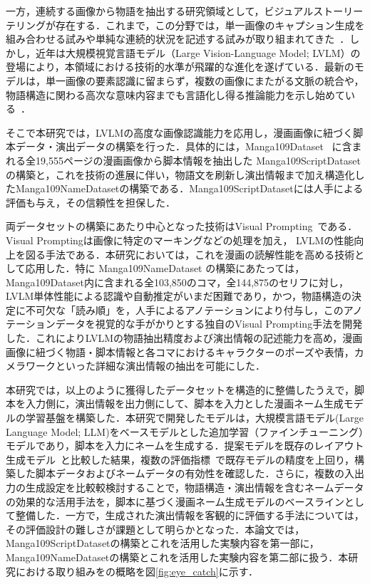 \documentclass[a4j,12pt,dvipdfmx]{jsreport}
\begin{document}
一方，連続する画像から物語を抽出する研究領域として，ビジュアルストーリーテリングが存在する．これまで，この分野では，単一画像のキャプション生成を組み合わせる試みや単純な連続的状況を記述する試みが取り組まれてきた~\cite{huang-etal-2016-visual, nahian_hierarchical_2019}．しかし，近年は大規模視覚言語モデル（Large Vision-Language Model; LVLM）の登場により，本領域における技術的水準が飛躍的な進化を遂げている．最新のモデルは，単一画像の要素認識に留まらず，複数の画像にまたがる文脈の統合や，物語構造に関わる高次な意味内容までも言語化し得る推論能力を示し始めている~\cite{yang_storyllava_2025}．

そこで本研究では，LVLMの高度な画像認識能力を応用し，漫画画像に紐づく脚本データ・演出データの構築を行った．具体的には，Manga109Dataset~\cite{matsui_2017_sketch} に含まれる全19,555ページの漫画画像から脚本情報を抽出した Manga109ScriptDatasetの構築と，これを技術の進展に伴い，物語文を刷新し演出情報まで加え構造化したManga109NameDatasetの構築である．Manga109ScriptDatasetには人手による評価も与え，その信頼性を担保した．

両データセットの構築にあたり中心となった技術はVisual Prompting~\cite{shtedritski_what_2023}である．Visual Promptingは画像に特定のマーキングなどの処理を加え， LVLMの性能向上を図る手法である．本研究においては，これを漫画の読解性能を高める技術として応用した．特に Manga109NameDataset の構築にあたっては，Manga109Dataset内に含まれる全103,850のコマ，全144,875のセリフに対し，LVLM単体性能による認識や自動推定がいまだ困難であり，かつ，物語構造の決定に不可欠な「読み順」を，人手によるアノテーションにより付与し，このアノテーションデータを視覚的な手がかりとする独自のVisual Prompting手法を開発した．これによりLVLMの物語抽出精度および演出情報の記述能力を高め，漫画画像に紐づく物語・脚本情報と各コマにおけるキャラクターのポーズや表情，カメラワークといった詳細な演出情報の抽出を可能にした．

本研究では，以上のように獲得したデータセットを構造的に整備したうえで，脚本を入力側に，演出情報を出力側にして、脚本を入力とした漫画ネーム生成モデルの学習基盤を構築した．本研究で開発したモデルは，大規模言語モデル(Large Language Model; LLM)をベースモデルとした追加学習（ファインチューニング）モデルであり，脚本を入力にネームを生成する．提案モデルを既存のレイアウト生成モデル~\cite{inoue_layoutdm_2023,jiang_layoutformer_2023,lin_layoutprompter_2023}と比較した結果，複数の評価指標~\cite{inoue_layoutdm_2023,otani_ltsim_2024}で既存モデルの精度を上回り，構築した脚本データおよびネームデータの有効性を確認した．さらに，複数の入出力の生成設定を比較較検討することで，物語構造・演出情報を含むネームデータの効果的な活用手法を，脚本に基づく漫画ネーム生成モデルのベースラインとして整備した．一方で，生成された演出情報を客観的に評価する手法については，その評価設計の難しさが課題として明らかとなった．本論文では，Manga109ScriptDatasetの構築とこれを活用した実験内容を第一部に， Manga109NameDatasetの構築とこれを活用した実験内容を第二部に扱う．本研究における取り組みをの概略を図\ref{fig:eye_catch}に示す．
\end{document}
